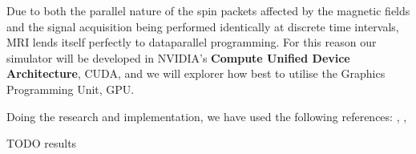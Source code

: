 
Due to both the parallel nature of the spin packets affected by the
magnetic fields and the signal acquisition being performed identically
at discrete time intervals, MRI lends itself perfectly to dataparallel
programming. For this reason our simulator will be developed in
NVIDIA's \textbf{Compute Unified Device Architecture}, CUDA, and we
will explorer how best to utilise the Graphics Programming Unit, GPU.


Doing the research and implementation, we have used the following
references: \cite{HaackeBook99}, \cite{feeman}, \cite{aibinu-mri}

TODO results

